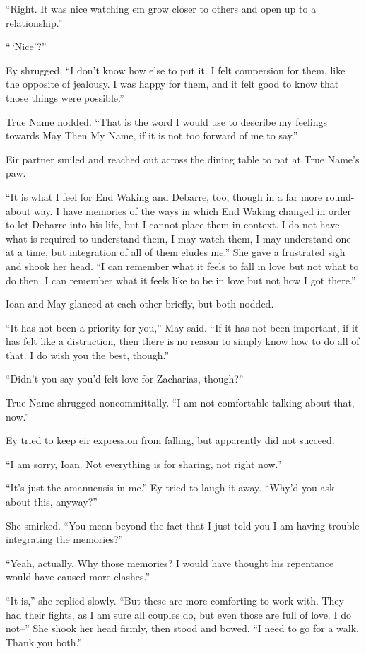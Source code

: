 ``Right. It was nice watching em grow closer to others and open up to a relationship.''

``\,`Nice'?''

Ey shrugged. ``I don't know how else to put it. I felt compersion for them, like the opposite of jealousy. I was happy for them, and it felt good to know that those things were possible.''

True Name nodded. ``That is the word I would use to describe my feelings towards May Then My Name, if it is not too forward of me to say.''

Eir partner smiled and reached out across the dining table to pat at True Name's paw.

``It is what I feel for End Waking and Debarre, too, though in a far more round-about way. I have memories of the ways in which End Waking changed in order to let Debarre into his life, but I cannot place them in context. I do not have what is required to understand them, I may watch them, I may understand one at a time, but integration of all of them eludes me.'' She gave a frustrated sigh and shook her head. ``I can remember what it feels to fall in love but not what to do then. I can remember what it feels like to be in love but not how I got there.''

Ioan and May glanced at each other briefly, but both nodded.

``It has not been a priority for you,'' May said. ``If it has not been important, if it has felt like a distraction, then there is no reason to simply know how to do all of that. I do wish you the best, though.''

``Didn't you say you'd felt love for Zacharias, though?''

True Name shrugged noncommittally. ``I am not comfortable talking about that, now.''

Ey tried to keep eir expression from falling, but apparently did not succeed.

``I am sorry, Ioan. Not everything is for sharing, not right now.''

``It's just the amanuensis in me.'' Ey tried to laugh it away. ``Why'd you ask about this, anyway?''

She smirked. ``You mean beyond the fact that I just told you I am having trouble integrating the memories?''

``Yeah, actually. Why those memories? I would have thought his repentance would have caused more clashes.''

``It is,'' she replied slowly. ``But these are more comforting to work with. They had their fights, as I am sure all couples do, but even those are full of love. I do not--'' She shook her head firmly, then stood and bowed. ``I need to go for a walk. Thank you both.''

